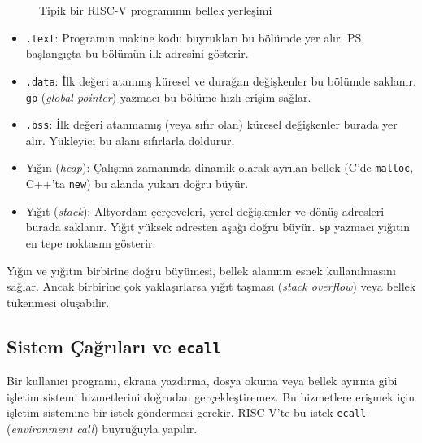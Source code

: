\begin{figure}[H]
\caption{Tipik bir RISC-V programının bellek yerleşimi}
\label{fig:bellek-haritasi}
\end{figure}

\begin{itemize}[nosep]
\item \texttt{.text}: Programın makine kodu buyrukları bu bölümde yer alır. PS başlangıçta bu bölümün ilk adresini gösterir.
\item \texttt{.data}: İlk değeri atanmış küresel ve durağan değişkenler bu bölümde saklanır. \texttt{gp} (\emph{global pointer}) yazmacı bu bölüme hızlı erişim sağlar.
\item \texttt{.bss}: İlk değeri atanmamış (veya sıfır olan) küresel değişkenler burada yer alır. Yükleyici bu alanı sıfırlarla doldurur.
\item Yığın (\emph{heap}): Çalışma zamanında dinamik olarak ayrılan bellek (C'de \texttt{malloc}, C++'ta \texttt{new}) bu alanda yukarı doğru büyür.
\item Yığıt (\emph{stack}): Altyordam çerçeveleri, yerel değişkenler ve dönüş adresleri burada saklanır. Yığıt yüksek adresten aşağı doğru büyür. \texttt{sp} yazmacı yığıtın en tepe noktasını gösterir.
\end{itemize}

Yığın ve yığıtın birbirine doğru büyümesi, bellek alanının esnek kullanılmasını sağlar. Ancak birbirine çok yaklaşırlarsa yığıt taşması (\emph{stack overflow}) veya bellek tükenmesi oluşabilir.

\subsection{Sistem Çağrıları ve \texttt{ecall}}
\label{sec:ecall}

Bir kullanıcı programı, ekrana yazdırma, dosya okuma veya bellek ayırma gibi işletim sistemi hizmetlerini doğrudan gerçekleştiremez. Bu hizmetlere erişmek için işletim sistemine bir istek göndermesi gerekir. RISC-V'te bu istek \texttt{ecall} (\emph{environment call}) buyruğuyla yapılır.

